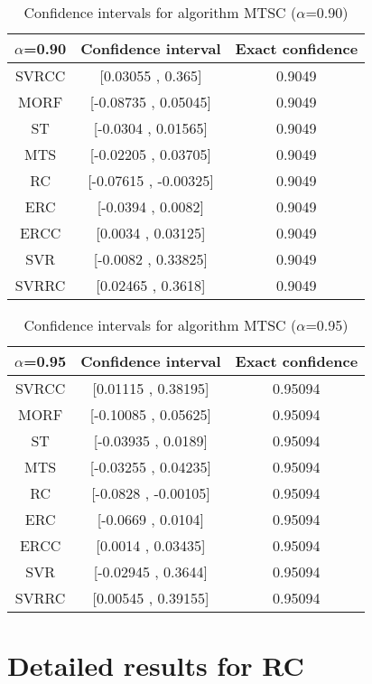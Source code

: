 \documentclass[a4paper,10pt]{article}
\begin{document}
\begin{table}[!htp]
\centering\small
\begin{tabular}{
|c|c|c|}
\hline
 $\alpha$=0.90 & Confidence interval & Exact confidence \\ \hline 
SVRCC & [0.03055 , 0.365] & 0.9049\\ \hline 
MORF & [-0.08735 , 0.05045] & 0.9049\\ \hline 
ST & [-0.0304 , 0.01565] & 0.9049\\ \hline 
MTS & [-0.02205 , 0.03705] & 0.9049\\ \hline 
RC & [-0.07615 , -0.00325] & 0.9049\\ \hline 
ERC & [-0.0394 , 0.0082] & 0.9049\\ \hline 
ERCC & [0.0034 , 0.03125] & 0.9049\\ \hline 
SVR & [-0.0082 , 0.33825] & 0.9049\\ \hline 
SVRRC & [0.02465 , 0.3618] & 0.9049\\ \hline 

\end{tabular}
\caption{Confidence intervals for algorithm MTSC ($\alpha$=0.90)}
\end{table}
\begin{table}[!htp]
\centering\small
\begin{tabular}{
|c|c|c|}
\hline
 $\alpha$=0.95 & Confidence interval & Exact confidence \\ \hline 
SVRCC & [0.01115 , 0.38195] & 0.95094\\ \hline 
MORF & [-0.10085 , 0.05625] & 0.95094\\ \hline 
ST & [-0.03935 , 0.0189] & 0.95094\\ \hline 
MTS & [-0.03255 , 0.04235] & 0.95094\\ \hline 
RC & [-0.0828 , -0.00105] & 0.95094\\ \hline 
ERC & [-0.0669 , 0.0104] & 0.95094\\ \hline 
ERCC & [0.0014 , 0.03435] & 0.95094\\ \hline 
SVR & [-0.02945 , 0.3644] & 0.95094\\ \hline 
SVRRC & [0.00545 , 0.39155] & 0.95094\\ \hline 

\end{tabular}
\caption{Confidence intervals for algorithm MTSC ($\alpha$=0.95)}
\end{table}

 \clearpage 


\section{Detailed results for RC}
\end{document}
